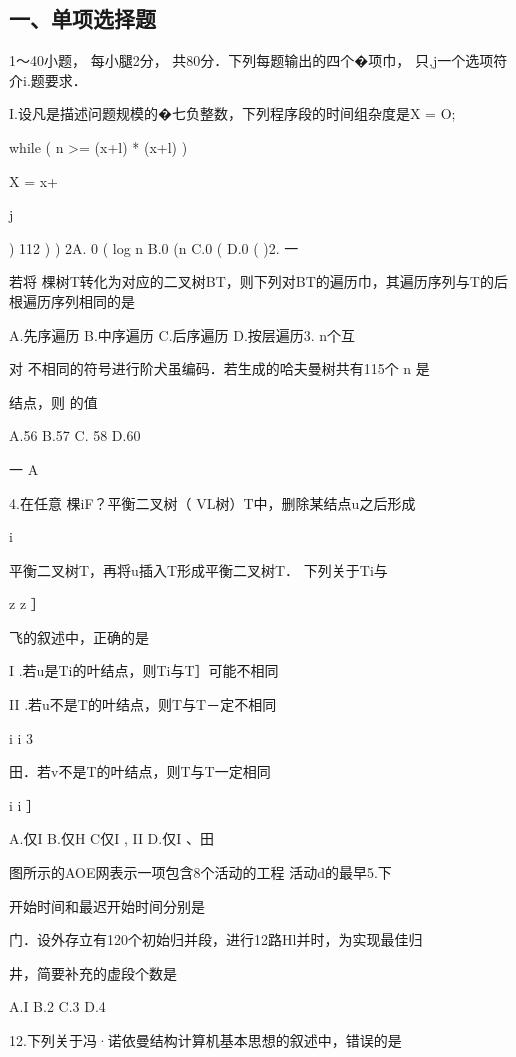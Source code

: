 
\subsection{一、单项选择题}
1～40小题， 每小腿2分， 共80分．下列每题输出的四个�项巾， 只,j一个选项符介i.题要求．

I.设凡是描述问题规模的�七负整数，下列程序段的时间组杂度是X = O;

  while ( n >= (x+l) *  (x+l) )

    X = x+ { j

    )    112 )    )    2A. 0 ( log n    B.0 (n     C.0 (     D.0 (  )2.    一

  若将  棵树T转化为对应的二叉树BT，则下列对BT的遍历巾，其遍历序列与T的后根遍历序列相同的是

  A.先序遍历    B.中序遍历    C.后序遍历   D.按层遍历3.   n个互

  对    不相同的符号进行阶犬虽编码．若生成的哈夫曼树共有115个    n    是

    结点，则  的值

  A.56    B.57    C. 58    D.60

    一    A

4.在任意  棵iF？平衡二叉树（ VL树）T中，删除某结点u之后形成

    i

  平衡二叉树T，再将u插入T形成平衡二叉树T． 下列关于Ti与

    z    z    ］

  飞的叙述中，正确的是

   I .若u是Ti的叶结点，则Ti与T］可能不相同

   II .若u不是T的叶结点，则T与T－定不相同

    i    i    3

  田．若v不是T的叶结点，则T与T一定相同

    i    i    ］

  A.仅I    B.仅H    C仅I , II    D.仅I 、田

    图所示的AOE网表示一项包含8个活动的工程  活动d的最早5.下

  开始时间和最迟开始时间分别是

    门．设外存立有120个初始归并段，进行12路Hl并时，为实现最佳归

    井，简要补充的虚段个数是

    A.I    B.2    C.3    D.4

    12.下列关于冯·诺依曼结构计算机基本思想的叙述中，错误的是

}
